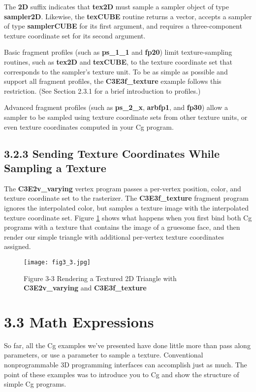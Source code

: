 \documentclass[../main.tex]{subfiles}
\begin{document}
The \textbf{2D} suffix indicates that \textbf{tex2D} must sample a sampler object of type \textbf{sampler2D}. Likewise, the \textbf{texCUBE} routine returns a vector, accepts a sampler of type \textbf{samplerCUBE} for its first argument, and requires a three-component texture coordinate set for its second argument.

Basic fragment profiles (such as \textbf{ps_1_1} and \textbf{fp20}) limit texture-sampling routines, such as \textbf{tex2D} and \textbf{texCUBE}, to the texture coordinate set that corresponds to the sampler's texture unit. To be as simple as possible and support all fragment profiles, the \textbf{C3E3f_texture} example follows this restriction. (See Section 2.3.1 for a brief introduction to profiles.)

Advanced fragment profiles (such as \textbf{ps_2_x}, \textbf{arbfp1}, and \textbf{fp30}) allow a sampler to be sampled using texture coordinate sets from other texture units, or even texture coordinates computed in your Cg program.

\subsection{3.2.3 Sending Texture Coordinates While Sampling a Texture}

The \textbf{C3E2v_varying} vertex program passes a per-vertex position, color, and texture coordinate set to the rasterizer. The \textbf{C3E3f_texture} fragment program ignores the interpolated color, but samples a texture image with the interpolated texture coordinate set. Figure \ref{fig:3-3} shows what happens when you first bind both Cg programs with a texture that contains the image of a gruesome face, and then render our simple triangle with additional per-vertex texture coordinates assigned.

\begin{figure}
    \centering
    \texttt{[image: fig3\_3.jpg]}
    \caption{Figure 3-3 Rendering a Textured 2D Triangle with \textbf{C3E2v_varying} and \textbf{C3E3f_texture}}
    \label{fig:3-3}
\end{figure}

\section{3.3 Math Expressions}

So far, all the Cg examples we've presented have done little more than pass along parameters, or use a parameter to sample a texture. Conventional nonprogrammable 3D programming interfaces can accomplish just as much. The point of these examples was to introduce you to Cg and show the structure of simple Cg programs.
\end{document}
